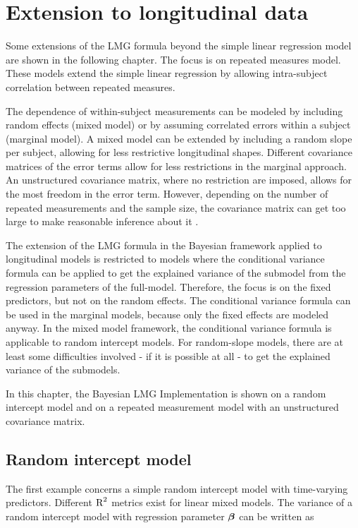 \documentclass[11pt,a4paper,twoside]{book}\usepackage[]{graphicx}\usepackage[]{color}
\begin{document}
\chapter{Extension to longitudinal data}

Some extensions of the LMG formula beyond the simple linear regression model are shown in the following chapter. The focus is on repeated measures model. These models extend the simple linear regression by allowing intra-subject correlation between repeated measures.

The dependence of within-subject measurements can be modeled by including random effects (mixed model) or by assuming correlated errors within a subject (marginal model). A mixed model can be extended by including a random slope per subject, allowing for less restrictive longitudinal shapes. Different covariance matrices of the error terms allow for less restrictions in the marginal approach. An unstructured covariance matrix, where no restriction are imposed, allows for the most freedom in the error term. However, depending on the number of repeated measurements and the sample size, the covariance matrix can get too large to make reasonable inference about it \citep{Fitzmaurice2011}. 

The extension of the LMG formula in the Bayesian framework applied to longitudinal models is restricted to models where the conditional variance formula can  be applied to get the explained variance of the submodel from the regression parameters of the full-model. Therefore, the focus is on the fixed predictors, but not on the random effects. The conditional variance formula can be used in the marginal models, because only the fixed effects are modeled anyway. In the mixed model framework, the conditional variance formula is applicable to random intercept models. For random-slope models, there are at least some difficulties involved - if it is possible at all - to get the explained variance of the submodels. 

In this chapter, the Bayesian LMG Implementation is shown on a random intercept model and on a repeated measurement model with an unstructured covariance matrix.  

\section{Random intercept model}
The first example concerns a simple random intercept model with time-varying predictors.  Different $\text{R}^2$ metrics exist for linear mixed models. The variance of a random intercept model with regression parameter ${\boldsymbol{\beta}}$ can be written as
\end{document}
